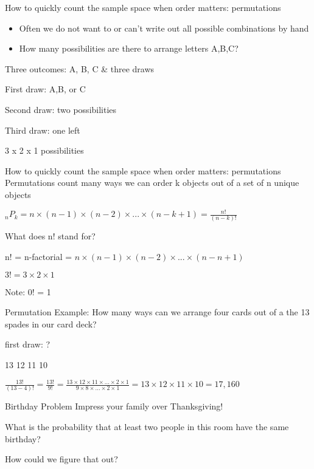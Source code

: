 \documentclass[presentation]{beamer}
\begin{document}
\begin{frame}[label={sec:org9d8af82}]{How to quickly count the sample space when order matters: permutations}
\begin{itemize}
\item Often we do not want to or can't write out all possible combinations by hand

\item How many possibilities are there to arrange letters A,B,C?
\end{itemize}

\pause

Three outcomes: A, B, C \& three draws

\pause
First draw: A,B, or C

Second draw: two possibilities

Third draw: one left

3 x 2 x 1 possibilities
\end{frame}

\begin{frame}[label={sec:org66cd648}]{How to quickly count the sample space when order matters: permutations}
Permutations count many ways we can \alert{order} k objects out of a set of n unique objects

\(_{n}P_{k} = n \times (n-1) \times (n-2) \times ... \times (n-k + 1) = \frac{n!}{(n-k)!}\)

What does n! stand for?

\pause

n! = n-factorial = \(n \times (n-1) \times (n-2) \times ... \times (n-n+1)\)

\(3! = 3 \times 2 \times 1\)

\alert{Note: 0! = 1}
\end{frame}


\begin{frame}[label={sec:orgf5e8b40}]{Permutation Example:}
How many ways can we arrange four cards out of a the 13 spades in our card deck?

first draw: ?
\pause

13 \texttimes{} 12 \texttimes{} 11 \texttimes{} 10

\pause

\(\frac{13!}{(13-4)!} = \frac{13!}{9!} = \frac{13 \times 12 \times 11 \times ... \times 2 \times 1}{9 \times 8 \times ... \times 2 \times 1} = 13 \times 12 \times 11 \times 10 = 17,160\)
\end{frame}

\begin{frame}[label={sec:org31aa2c0}]{Birthday Problem}
Impress your family over Thanksgiving!

\pause

What is the probability that at least two people in this room have the same birthday?

How could we figure that out?
\end{frame}
\end{document}
